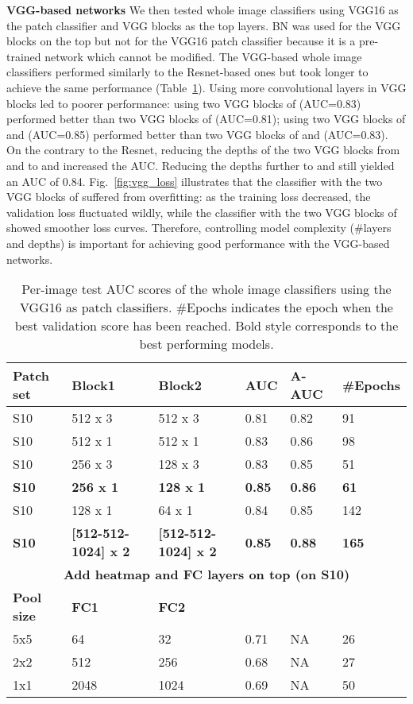\documentclass[12pt,letterpaper]{article}
\begin{document}
\textbf{VGG-based networks}
\label{vgg_auc}
We then tested whole image classifiers using VGG16 as the patch classifier and VGG blocks as the top layers. BN was used for the VGG blocks on the top but not for the VGG16 patch classifier because it is a pre-trained network which cannot be modified. The VGG-based whole image classifiers performed similarly to the Resnet-based ones but took longer to achieve the same performance (Table~\ref{tab:vgg_auc}). Using more convolutional layers in VGG blocks led to poorer performance: using two VGG blocks of  (AUC=0.83) performed better than two VGG blocks of  (AUC=0.81); using two VGG blocks of  and  (AUC=0.85) performed better than two VGG blocks of  and  (AUC=0.83). On the contrary to the Resnet, reducing the depths of the two VGG blocks from  and  to  and  increased the AUC. Reducing the depths further to  and  still yielded an AUC of 0.84. Fig.~\ref{fig:vgg_loss} illustrates that the classifier with the two VGG blocks of  suffered from overfitting: as the training loss decreased, the validation loss fluctuated wildly, while the classifier with the two VGG blocks of  showed smoother loss curves. Therefore, controlling model complexity (\#layers and depths) is important for achieving good performance with the VGG-based networks.


\begin{table}
\centering
\caption{Per-image test AUC scores of the whole image classifiers using the VGG16 as patch classifiers. \#Epochs indicates the epoch when the best validation score has been reached. Bold style corresponds to the best performing models.}
\label{tab:vgg_auc}
\begin{tabular}{@{}llllll@{}}
\toprule
\textbf{Patch set} & \textbf{Block1} & \textbf{Block2} & \textbf{AUC} & \textbf{A-AUC} & \textbf{\#Epochs} \\ \midrule
S10 & 512 x 3 & 512 x 3 & 0.81 & 0.82 & 91 \\
S10 & 512 x 1 & 512 x 1 & 0.83 & 0.86 & 98 \\
S10 & 256 x 3 & 128 x 3 & 0.83 & 0.85 & 51 \\
\textbf{S10} & \textbf{256 x 1} & \textbf{128 x 1} & \textbf{0.85} & \textbf{0.86} & \textbf{61} \\
S10 & 128 x 1 & 64 x 1 & 0.84 & 0.85 & 142 \\
\textbf{S10} & \textbf{{[}512-512-1024{]} x 2} & \textbf{{[}512-512-1024{]} x 2} & \textbf{0.85} & \textbf{0.88} & \textbf{165} \\ \midrule
\multicolumn{6}{c}{\textbf{Add heatmap and FC layers on top (on S10)}} \\ \midrule
\textbf{Pool size} & \textbf{FC1} & \textbf{FC2} & \textbf{} & \textbf{} & \textbf{} \\
5x5 & 64 & 32 & 0.71 & NA & 26 \\
2x2 & 512 & 256 & 0.68 & NA & 27 \\
1x1 & 2048 & 1024 & 0.69 & NA & 50 \\ \bottomrule
\end{tabular}
\end{table}
\end{document}

